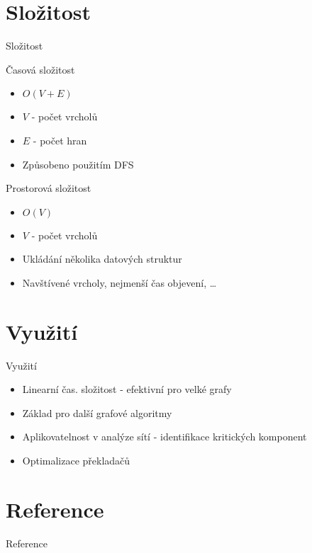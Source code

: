 \documentclass{beamer}
\begin{document}
\section{Složitost}
\begin{frame}{Složitost}
\begin{block}{Časová složitost}
    \begin{itemize}
        \item $O(V + E)$
        \item $V$ - počet vrcholů
        \item $E$ - počet hran
        \item Způsobeno použitím DFS
    \end{itemize}
\end{block}

\begin{block}{Prostorová složitost}
    \begin{itemize}
        \item $O(V)$
        \item $V$ - počet vrcholů
        \item Ukládání několika datových struktur
        \item Navštívené vrcholy, nejmenší čas objevení, \dots
    \end{itemize}
\end{block}
\end{frame}

\section{Využití}
\begin{frame}{Využití}
    \begin{itemize}
        \item Linearní čas. složitost - efektivní pro velké grafy
        \item Základ pro další grafové algoritmy
        \item Aplikovatelnost v analýze sítí - identifikace kritických komponent
        \item Optimalizace překladačů
    \end{itemize}
\end{frame}

\section{Reference}
\begin{frame}{Reference}
    \nocite{*}
    
	\renewcommand{\refname}{Reference}
	

\end{frame}
\end{document}
